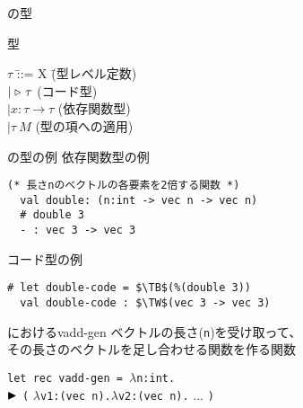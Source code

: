 \documentclass[dvipdfmx,aspectratio=169, 20pt]{beamer}
\begin{document}
\begin{frame}[fragile]{\LMD の型}
    \begin{block}{型}
        \begin{tabbing}
            \hspace{5mm} \( \tau \) \= ::= X \hspace{20mm} \= (型レベル定数) \\
            \> \( \mid {\mathop{\triangleright}}\ \tau \) \> (コード型) \\
            \> \( \mid x:\tau \to \tau \) \> (依存関数型) \\
            \> \( \mid \tau\ M \) \> (型の項への適用)
        \end{tabbing}
    \end{block}
\end{frame}

\begin{frame}[fragile]{\LMD の型の例}
    依存関数型の例
    \begin{exampleblock}{}
        \begin{Verbatim}[commandchars=\\\{\},codes={\catcode`$=3\catcode`^=7}]
  (* 長さnのベクトルの各要素を2倍する関数 *)
  val double: (n:int -> vec n -> vec n)
  # double 3
  - : vec 3 -> vec 3
        \end{Verbatim}
    \end{exampleblock}
    コード型の例
    \begin{exampleblock}{}
        \begin{Verbatim}[commandchars=\\\{\},codes={\catcode`$=3\catcode`^=7}]
  # let double-code = $\TB$(%(double 3))
  val double-code : $\TW$(vec 3 -> vec 3)
        \end{Verbatim}
    \end{exampleblock}
\end{frame}

\begin{frame}[fragile]{\LMD におけるvadd-gen}
    ベクトルの長さ(\verb|n|)を受け取って、\\その長さのベクトルを足し合わせる関数を作る関数
    \begin{exampleblock}{}
        \hspace{5mm} \verb|let rec vadd-gen = |$\lambda$\verb|n:int.| \\
        \hspace{10mm} ${\mathop{\blacktriangleright}}$ \verb|(| $\lambda$\verb|v1:(vec |\onslide<2->{\underline{\%}}\verb|n).|$\lambda$\verb|v2:(vec |\verb|n).| ... \verb|)|
    \end{exampleblock}
\end{frame}
\end{document}
